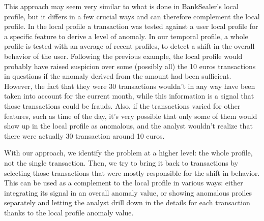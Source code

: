 This approach may seem very similar to what is done in BankSealer's local profile, but it differs in a few crucial ways and can therefore complement the local profile. In the local profile a transaction was tested against a user local profile for a specific feature to derive a level of anomaly. In our temporal profile, a whole profile is tested with an average of recent profiles, to detect a shift in the overall behavior of the user. Following the previous example, the local profile would probably have raised suspicion over some (possibly all) the 10 euros transactions in questions if the anomaly derived from the amount had been sufficient. However, the fact that they were 30 transactions wouldn't in any way have been taken into account for the current month, while this information is a signal that those transactions could be frauds. Also, if the transactions varied for other features, such as time of the day, it's very possible that only some of them would show up in the local profile as anomalous, and the analyst wouldn't realize that there were actually 30 transaction around 10 euros.

With our approach, we identify the problem at a higher level: the whole profile, not the single transaction. Then, we try to bring it back to transactions by selecting those transactions that were mostly responsible for the shift in behavior. This can be used as a complement to the local profile in various ways: either integrating its signal in an overall anomaly value, or showing anomalous proiles separately and letting the analyst drill down in the details for each transaction thanks to the local profile anomaly value.
